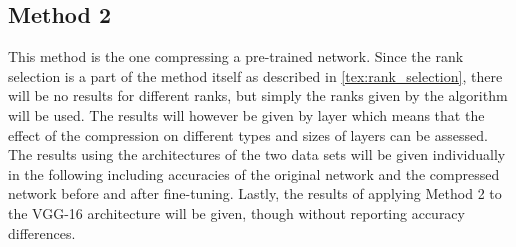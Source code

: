 \subsection{Method 2}
This method is the one compressing a pre-trained network. Since the rank selection is a part of the method itself as described in \autoref{tex:rank_selection}, there will be no results for different ranks, but simply the ranks given by the algorithm will be used. The results will however be given by layer which means that the effect of the compression on different types and sizes of layers can be assessed. The results using the architectures of the two data sets will be given individually in the following including accuracies of the original network and the compressed network before and after fine-tuning. Lastly, the results of applying Method 2 to the VGG-16 architecture will be given, though without reporting accuracy differences.

